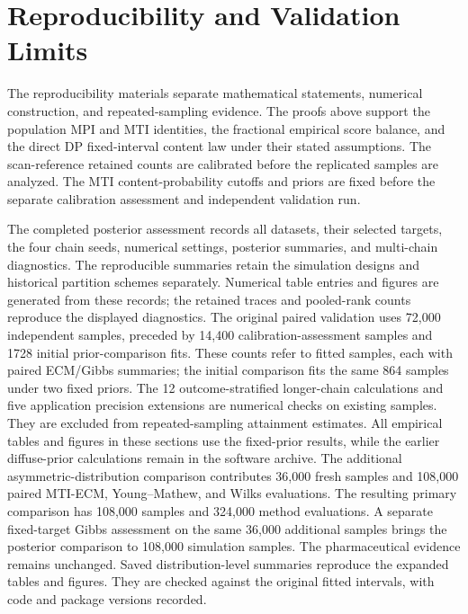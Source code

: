\documentclass[11pt]{article}
\begin{document}


\section{Reproducibility and Validation Limits}
\label{sec:supp-reproducibility}

The reproducibility materials separate mathematical statements, numerical
construction, and repeated-sampling evidence. The proofs above support the
population MPI and MTI identities, the fractional empirical score balance, and
the direct DP fixed-interval content law under their stated assumptions. The
scan-reference retained counts are calibrated before the replicated samples are analyzed.
The MTI content-probability cutoffs and priors are fixed before the separate
calibration assessment and independent validation run.

The completed posterior assessment records all \MTIGibbsAssessedDatasets{} datasets,
their selected targets, the four chain seeds, numerical settings, posterior
summaries, and multi-chain diagnostics. The reproducible summaries retain
the simulation designs and historical partition schemes separately.
Numerical table entries and figures are generated from these records;
the retained traces and pooled-rank counts reproduce the displayed
diagnostics. The original paired validation uses 72,000 independent samples, preceded by 14,400
calibration-assessment samples and 1728 initial prior-comparison fits.
These counts refer to fitted samples, each with paired ECM/Gibbs summaries;
the initial comparison fits the same 864 samples under two fixed priors.
The 12 outcome-stratified longer-chain calculations and five application
precision extensions are numerical checks on existing samples. They are
excluded from repeated-sampling attainment estimates. All empirical tables
and figures in these sections use the fixed-prior results, while the earlier
diffuse-prior calculations remain in the software archive.
The additional asymmetric-distribution comparison contributes 36,000 fresh
samples and 108,000 paired MTI-ECM, Young--Mathew, and Wilks evaluations.
The resulting primary comparison has 108,000 samples and 324,000 method
evaluations. A separate fixed-target Gibbs assessment on the same 36,000
additional samples brings the posterior comparison to 108,000 simulation
samples. The pharmaceutical evidence remains unchanged. Saved distribution-level summaries
reproduce the expanded tables and figures. They are checked against the
original fitted intervals, with code and package versions recorded.
\end{document}
